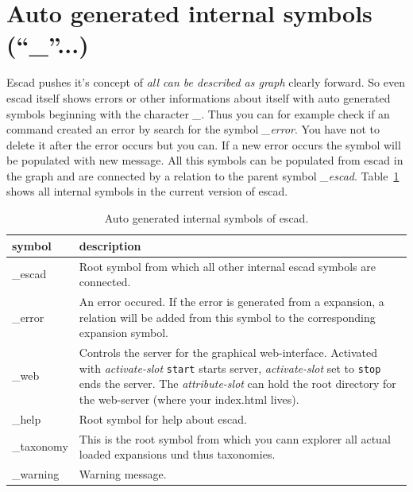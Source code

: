 \documentclass[a4paper, 12pt, openany]{scrbook}
\begin{document}
\section{Auto generated internal symbols (``\_''...)}
Escad pushes it's concept of \emph{all can be described as graph} clearly forward. So even escad itself shows errors or other informations about itself with auto generated symbols beginning with the character \emph{\_}. Thus you can for example check if an command created an error by search for the symbol \emph{\_error}. You have not to delete it after the error occurs but you can. If a new error occurs the symbol will be populated with new message. All this symbols can be populated from escad in the graph and are connected by a relation to the parent symbol \emph{\_escad}.
Table~\ref{tab:internal-symbols} shows all internal symbols in the current version of escad.
\begin{table}[htbp]
\centering
\begin{tabular}{|p{4cm}|p{12cm}|}
  \hline
  \textbf{symbol} & \textbf{description} \\
  \hline
  \_escad & Root symbol from which all other internal escad symbols are connected. \\
  \hline
  \_error & An error occured. If the error is generated from a expansion, a relation will be added from this symbol to the corresponding expansion symbol. \\
  \hline
  \_web & Controls the server for the graphical web-interface. Activated with \emph{activate-slot} \texttt{start} starts server, \emph{activate-slot} set to \texttt{stop} ends the server. The \emph{attribute-slot} can hold the root directory for the web-server (where your index.html lives). \\
  \hline
  \_help & Root symbol for help about escad. \\
  \hline
  \_taxonomy & This is the root symbol from which you cann explorer all actual loaded expansions und thus taxonomies. \\
  \hline
  \_warning & Warning message. \\
  \hline
\end{tabular}
\caption{Auto generated internal symbols of escad.}
\label{tab:internal-symbols}
\end{table}
\end{document}
